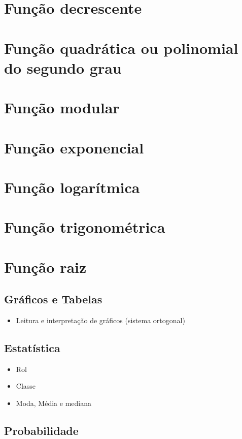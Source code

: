 \documentclass[11pt,fleqn]{book}
\begin{document}
\chapter{Função decrescente}

\chapter{Função quadrática ou polinomial do segundo grau}

\chapter{Função modular}

\chapter{Função exponencial}

\chapter{Função logarítmica}

\chapter{Função trigonométrica}

\chapter{Função raiz}


\section{Gráficos e Tabelas}%
\begin{itemize}
	\item Leitura e interpretação de gráficos (sistema ortogonal)
\end{itemize}

\section{Estatística}%
	\begin{itemize}
		\item Rol
		\item Classe
		\item Moda, Média e mediana 
	\end{itemize}

\section{Probabilidade}%
\end{document}
